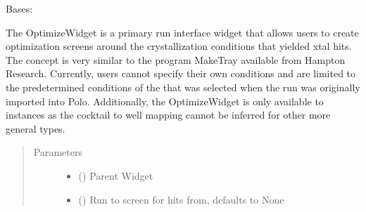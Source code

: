 \documentclass[letterpaper,10pt,english]{sphinxmanual}
\begin{document}
\begin{fulllineitems}
\label{\detokenize{polo.widgets:polo.widgets.optimize_widget.OptimizeWidget}}
Bases: 

\begin{fulllineitems}
\label{\detokenize{polo.widgets:polo.widgets.optimize_widget.OptimizeWidget.GRID_ICON}}
The OptimizeWidget is a primary run interface widget that allows
users to create optimization screens around the crystallization conditions
that yielded xtal hits. The concept is very similar to the program MakeTray
available from Hampton Research. Currently, users cannot specify their
own conditions and are limited to the predetermined conditions of the
{\hyperref[\detokenize{polo.utils:polo.utils.io_utils.Menu}]{}} that was selected when the run was originally imported
into Polo. Additionally, the OptimizeWidget is only available to  instances
as the cocktail to well mapping cannot be inferred for other more
general  types.
\begin{quote}\begin{description}
\item[{Parameters}] \leavevmode\begin{itemize}
\item {} 
 () \textendash{} Parent Widget

\item {} 
 ({\hyperref[\detokenize{polo.crystallography:polo.crystallography.run.HWIRun}]{}}\sphinxstyleliteralemphasis{\sphinxupquote{, }}) \textendash{} Run to screen for hits from, defaults to None


\end{itemize}
\end{description}
\end{quote}
\end{fulllineitems}
\end{fulllineitems}
\end{document}
